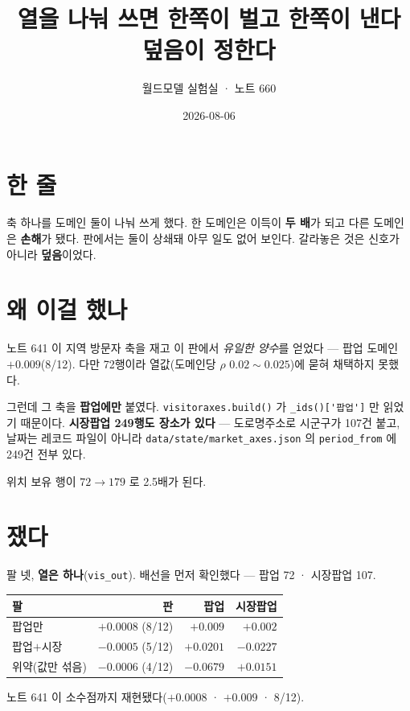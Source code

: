 \documentclass[10pt,a4paper]{article}
\title{\bfseries 열을 나눠 쓰면 한쪽이 벌고 한쪽이 낸다\\[2pt]
\large 덮음이 정한다}
\author{월드모델 실험실 · 노트 660}
\date{2026-08-06}
\begin{document}
\maketitle

\section{한 줄}

축 하나를 도메인 둘이 나눠 쓰게 했다. 한 도메인은 이득이 \textbf{두 배}가 되고
다른 도메인은 \textbf{손해}가 됐다. 판에서는 둘이 상쇄돼 아무 일도 없어 보인다.
갈라놓은 것은 신호가 아니라 \textbf{덮음}이었다.

\section{왜 이걸 했나}

노트 641 이 지역 방문자 축을 재고 이 판에서 \emph{유일한 양수}를 얻었다 ---
팝업 도메인 $+0.009$(8/12). 다만 72행이라 열값(도메인당 $\rho$ $0.02\sim0.025$)에
묻혀 채택하지 못했다.

그런데 그 축을 \textbf{팝업에만} 붙였다. \verb|visitoraxes.build()| 가
\verb|_ids()['팝업']| 만 읽었기 때문이다. \textbf{시장팝업 249행도 장소가 있다} ---
도로명주소로 시군구가 107건 붙고, 날짜는 레코드 파일이 아니라
\verb|data/state/market_axes.json| 의 \verb|period_from| 에 249건 전부 있다.

위치 보유 행이 $72 \to 179$ 로 2.5배가 된다.

\section{쟀다}

팔 넷, \textbf{열은 하나}(\verb|vis_out|). 배선을 먼저 확인했다 --- 팝업 72 ·
시장팝업 107.

\begin{center}\small
\begin{tabular}{lrrr}\toprule
팔 & 판 & 팝업 & 시장팝업 \\ \midrule
팝업만 & $+0.0008$ (8/12) & $+0.009$ & $+0.002$ \\
팝업$+$시장 & $-0.0005$ (5/12) & $\mathbf{+0.0201}$ & $\mathbf{-0.0227}$ \\
위약(값만 섞음) & $-0.0006$ (4/12) & $-0.0679$ & $+0.0151$ \\ \bottomrule
\end{tabular}\end{center}

노트 641 이 소수점까지 재현됐다($+0.0008$ · $+0.009$ · 8/12).
\end{document}
